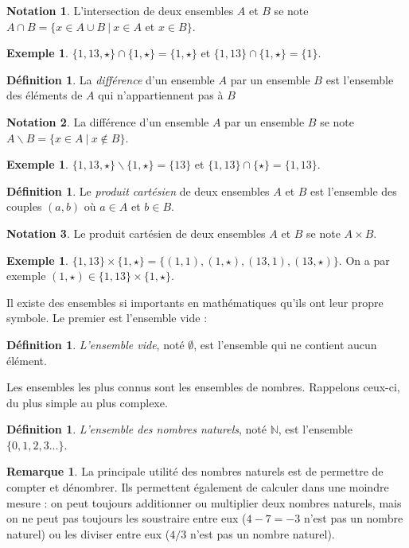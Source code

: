 \documentclass[a4paper,13pt]{scrreprt}
\theoremstyle{plain}
\theoremstyle{definition}
\newtheorem{déf}[subsection]{Définition}
\newtheorem{exe}[subsection]{Exemple}
\newtheorem{rema}[subsection]{Remarque}
\newtheorem*{nota}{Notation}
\newcommand{\nn}{\mathbb{N}}
\begin{document}
\begin{nota}
	L'intersection de deux ensembles $A$ et $B$ se note $A\cap B = \{x \in A \cup B ~|~x \in A$ et $x\in B\}$.
\end{nota}
\begin{exe}
	$\{1,13,\star\} \cap \{1,\star\} = \{1,\star\}$ et $\{1,13\} \cap \{1,\star\} = \{1\}$.
\end{exe}
\begin{déf}
	La \emph{différence} d'un ensemble $A$ par un ensemble $B$ est l'ensemble des éléments de $A$ qui n'appartiennent pas à $B$
\end{déf}
\begin{nota}
	La différence d'un ensemble $A$ par un ensemble $B$ se note $A \backslash B = \{x \in A  ~|~x\notin B\}$.
\end{nota}
\begin{exe}
	$\{1,13,\star\} \backslash \{1,\star\} = \{13\}$ et $\{1,13\} \cap \{\star\} = \{1,13\}$.
\end{exe}
\begin{déf}
	Le \emph{produit cartésien} de deux ensembles $A$ et $B$ est l'ensemble des couples $(a,b)$ où $a\in A$ et $b \in B$.
\end{déf}
\begin{nota}
	Le produit cartésien de deux ensembles $A$ et $B$ se note $A \times B$.
\end{nota}
\begin{exe}
	$\{1,13\} \times \{1,\star\} = \{(1,1),(1,\star),(13,1),(13,\star)\}$. On a par exemple $(1,\star) \in \{1,13\} \times \{1,\star\}$.
\end{exe}

Il existe des ensembles si importants en mathématiques qu'ils ont leur propre symbole. Le premier est l'ensemble vide :

\begin{déf}
	\emph{L'ensemble vide}, noté $\emptyset$, est l'ensemble qui ne contient aucun élément.
\end{déf}

Les ensembles les plus connus sont les ensembles de nombres. Rappelons ceux-ci, du plus simple au plus complexe.

\begin{déf}
	\emph{L'ensemble des nombres naturels}, noté $\nn$, est l'ensemble $\{0,1,2,3...\}$.
\end{déf}
\begin{rema}
	La principale utilité des nombres naturels est de permettre de compter et dénombrer. Ils permettent également de calculer dans une moindre mesure : on peut toujours additionner ou multiplier deux nombres naturels, mais on ne peut pas toujours les soustraire entre eux ($4-7=-3$ n'est pas un nombre naturel) ou les diviser entre eux ($4/3$ n'est pas un nombre naturel).
\end{rema}
\end{document}
